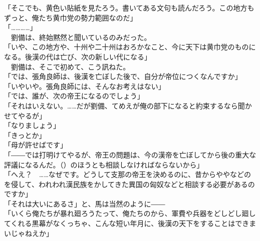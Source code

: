 \documentclass[
  paper=a5,
  fontsize=10pt,
  jafontsize=9.5pt,
  tate,                  %
  open_bracket_pos=nibu, %
]{jlreq}
\begin{document}
「そこでも、黄色い貼紙を見たろう。書いてある文句も読んだろう。この地方もずっと、俺たち黄巾党の勢力範囲なのだ」\\


「…………」\\


　劉備は、終始黙然と聞いているのみだった。\\


「いや、この地方や、十州や二十州はおろかなこと、今に天下は黄巾党のものになる。後漢の代は亡び、次の新しい代になる」\\


　劉備は、そこで初めて、こう訊ねた。\\


「では、張角良師は、後漢を亡ぼした後で、自分が帝位につくなんですか」\\


「いやいや。張角良師には、そんなお考えはない」\\


「では、誰が、次の帝王になるのでしょう」\\


「それはいえない。……だが劉備、てめえが俺の部下になると約束するなら聞かせてやるが」\\


「なりましょう」\\


「きっとか」\\


「母が許せばです」\\


「――では打明けてやるが、帝王の問題は、今の漢帝を亡ぼしてから後の重大な評議になるんだ。（）のほうとも相談しなければならないから」\\


「へえ？　……なぜです。どうして支那の帝王を決めるのに、昔からややなどのを侵して、われわれ漢民族をかしてきた異国の匈奴などと相談する必要があるのですか」\\


「それは大いにあるさ」と、馬は当然のように――\\


「いくら俺たちが暴れ廻ろうたって、俺たちのから、軍費や兵器をどしどし廻してくれる黒幕がなくっちゃ、こんな短い年月に、後漢の天下をすることはできまいじゃねえか」\\
\end{document}
